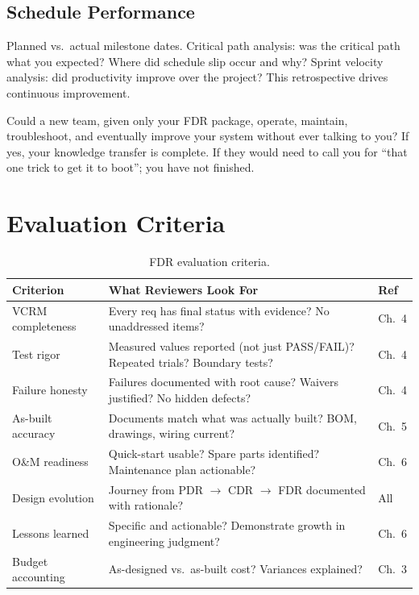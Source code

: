 \subsection{Schedule Performance}
Planned vs.\ actual milestone dates. Critical path analysis: was the critical path what you expected? Where did schedule slip occur and why? Sprint velocity analysis: did productivity improve over the project? This retrospective drives continuous improvement.


\begin{tipbox}
Could a new team, given only your FDR package, operate, maintain, troubleshoot, and eventually improve your system without ever talking to you? If yes, your knowledge transfer is complete. If they would need to call you for ``that one trick to get it to boot''; you have not finished.
\end{tipbox}

\section{Evaluation Criteria}

\begin{table}[htbp]\centering\small
\begin{tabularx}{\textwidth}{l X l}
\toprule
\textbf{Criterion} & \textbf{What Reviewers Look For} & \textbf{Ref} \\
\midrule
VCRM completeness & Every req has final status with evidence? No unaddressed items? & Ch.~4 \\
Test rigor & Measured values reported (not just PASS/FAIL)? Repeated trials? Boundary tests? & Ch.~4 \\
Failure honesty & Failures documented with root cause? Waivers justified? No hidden defects? & Ch.~4 \\
As-built accuracy & Documents match what was actually built? BOM, drawings, wiring current? & Ch.~5 \\
O\&M readiness & Quick-start usable? Spare parts identified? Maintenance plan actionable? & Ch.~6 \\
Design evolution & Journey from PDR $\to$ CDR $\to$ FDR documented with rationale? & All \\
Lessons learned & Specific and actionable? Demonstrate growth in engineering judgment? & Ch.~6 \\
Budget accounting & As-designed vs.\ as-built cost? Variances explained? & Ch.~3 \\
\bottomrule
\end{tabularx}
\caption{FDR evaluation criteria.}
\end{table}

